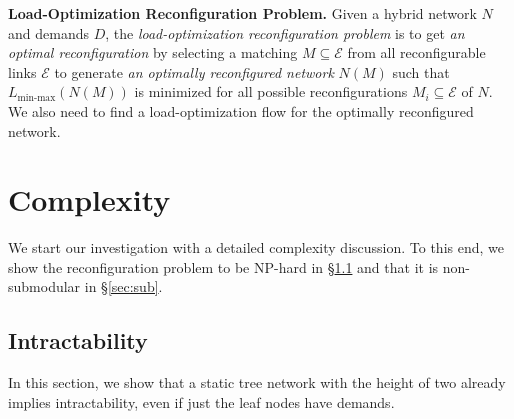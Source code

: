 \documentclass[sigconf]{acmart}
\newcommand{\E}{\mathcal{E}}  %
\newcommand\todo[1]{\color{red}\textbf{#1}\color{black}}
\begin{document}
\noindent\textbf{Load-Optimization Reconfiguration Problem.} 
Given a hybrid network $N$ and demands $D$, the \emph{load-optimization reconfiguration problem} is to get \emph{an  optimal reconfiguration} by selecting a matching $M\subseteq \E$ from all reconfigurable links $\E$ to generate \emph{an optimally reconfigured network} $N(M)$ such that $L_{\text{min-max}}\left(N(M) \right)$ is minimized for all possible reconfigurations $M_i\subseteq\E$ of $N$.
%
We also need to find a load-optimization flow  for the optimally reconfigured network. %







\section{Complexity}\label{sec:combined}
We start our investigation with a detailed complexity discussion.
To this end, we show the reconfiguration problem to be NP-hard in \S\ref{sec:complexity} and that it is non-submodular in \S\ref{sec:sub}.

\subsection{Intractability}\label{sec:complexity}
In this section, we show that  a static tree network with the height of two already implies intractability, even if just the leaf nodes have demands.
\end{document}

